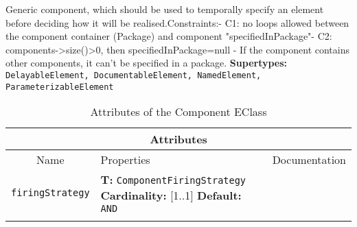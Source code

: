 \documentclass{article}
\begin{document}
Generic component, which should be used to temporally specify an element before deciding how it will be realised.Constraints:- C1: no loops allowed between the component container (Package) and component "specifiedInPackage"- C2: components->size()>0, then specifiedInPackage=null - If the component contains other components, it can't be specified in a package.
\textbf{Supertypes: }\texttt{DelayableElement, DocumentableElement, NamedElement, ParameterizableElement}
\begin{table}[H]
\footnotesize
\begin{tabularx}{\textwidth}{|c| p{4 cm} | X |}
\hline
\multicolumn{3}{|c|}{\textbf{Attributes}} \\
\hline
Name & Properties & Documentation \\ \hline \hline
\texttt{firingStrategy}
 & 
\textbf{T:} \texttt{ComponentFiringStrategy}
\newline
\textbf{Cardinality:} [1..1]
\newline
\textbf{Default:} \texttt{AND}
 & \\ \hline
\caption{Attributes of the Component EClass}
\end{tabularx}
\label{e4smComponentattr}
\end{table}
\end{document}
